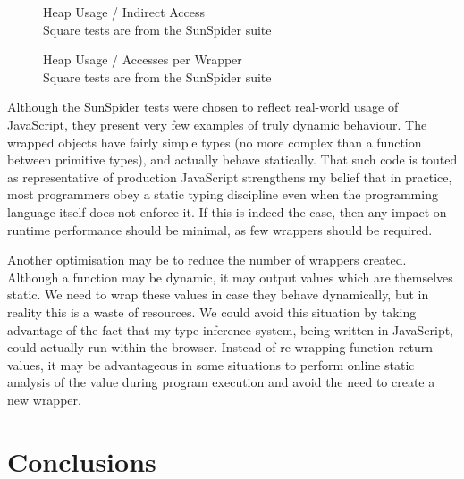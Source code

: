\documentclass[12pt,a4paper,twoside,openright]{report}
\theoremstyle{definition}
\theoremstyle{dotless}
\begin{document}
\begin{figure}[H]

  \caption[Graph of Heap Usage / Indirect Access]{Heap Usage / Indirect Access\\ \footnotesize{Square tests are from the SunSpider suite}}
  \label{fig:mem1}
\end{figure}
\begin{figure}[H]
  \caption[Graph of Heap Usage / Acceses per Wrapper]{Heap Usage / Accesses per Wrapper\\ \footnotesize{Square tests are from the SunSpider suite}}
  \label{fig:mem2}
\end{figure}
Although the SunSpider tests were chosen to reflect real-world usage of
JavaScript, they present very few examples of truly dynamic behaviour.
The wrapped objects have fairly simple types (no 
more complex than a function between primitive types), and actually behave 
statically. That such code is touted as representative of
production JavaScript strengthens my belief that in practice, most programmers obey a 
static typing discipline even when the programming language itself does not enforce it.
If this is indeed the case, then any impact on runtime performance should be minimal,
as few wrappers should be required.

Another optimisation may be to reduce the number of wrappers created. Although
a function may be dynamic, it may output values which are themselves static. We
need to wrap these values in case they behave dynamically, but in reality this
is a waste of resources. We could avoid this situation by taking advantage of
the fact that my type inference system, being written in JavaScript, could
actually run within the browser. Instead of re-wrapping function return values,
it may be advantageous in some situations to perform online static analysis of
the value during program execution and avoid the need to create a new wrapper.

\chapter{Conclusions}
\end{document}
